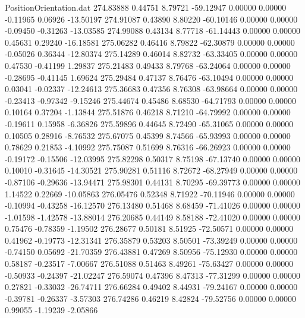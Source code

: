 \begin{filecontents}{PositionOrientation.dat}
 274.83888    0.44751    8.79721   -59.12947    0.00000    0.00000   -0.11965    0.06926  -13.50197
 274.91087    0.43890    8.80220   -60.10146    0.00000    0.00000   -0.09450   -0.31263  -13.03585
 274.99088    0.43134    8.77718   -61.14443    0.00000    0.00000    0.45631    0.29240  -16.18581
 275.06282    0.46416    8.79822   -62.30879    0.00000    0.00000   -0.05026    0.36344  -12.80374
 275.14289    0.46014    8.82732   -63.33405    0.00000    0.00000    0.47530   -0.41199    1.29837
 275.21483    0.49433    8.79768   -63.24064    0.00000    0.00000   -0.28695   -0.41145    1.69624
 275.29484    0.47137    8.76476   -63.10494    0.00000    0.00000    0.03041   -0.02337  -12.24613
 275.36683    0.47356    8.76308   -63.98664    0.00000    0.00000   -0.23413   -0.97342   -9.15246
 275.44674    0.45486    8.68530   -64.71793    0.00000    0.00000    0.10164    0.37204   -1.13844
 275.51876    0.46218    8.71210   -64.79992    0.00000    0.00000   -0.19611    0.15958   -6.36826
 275.59896    0.44645    8.72490   -65.31065    0.00000    0.00000    0.10505    0.28916   -8.76532
 275.67075    0.45399    8.74566   -65.93993    0.00000    0.00000    0.78629    0.21853   -4.10992
 275.75087    0.51699    8.76316   -66.26923    0.00000    0.00000   -0.19172   -0.15506  -12.03995
 275.82298    0.50317    8.75198   -67.13740    0.00000    0.00000    0.10010   -0.31645  -14.30521
 275.90281    0.51116    8.72672   -68.27949    0.00000    0.00000   -0.87106   -0.29636  -13.94471
 275.98301    0.44131    8.70295   -69.39773    0.00000    0.00000    1.14522    0.22669  -10.05863
 276.05476    0.52348    8.71922   -70.11946    0.00000    0.00000   -0.10994   -0.43258  -16.12570
 276.13480    0.51468    8.68459   -71.41026    0.00000    0.00000   -1.01598   -1.42578  -13.88014
 276.20685    0.44149    8.58188   -72.41020    0.00000    0.00000    0.75476   -0.78359   -1.19502
 276.28677    0.50181    8.51925   -72.50571    0.00000    0.00000    0.41962   -0.19773  -12.31341
 276.35879    0.53203    8.50501   -73.39249    0.00000    0.00000   -0.74150    0.05692  -21.70359
 276.43881    0.47269    8.50956   -75.12930    0.00000    0.00000    0.58187   -0.23517   -7.00667
 276.51088    0.51463    8.49261   -75.63427    0.00000    0.00000   -0.50933   -0.24397  -21.02247
 276.59074    0.47396    8.47313   -77.31299    0.00000    0.00000    0.27821   -0.33032  -26.74711
 276.66284    0.49402    8.44931   -79.24167    0.00000    0.00000   -0.39781   -0.26337   -3.57303
 276.74286    0.46219    8.42824   -79.52756    0.00000    0.00000    0.99055   -1.19239   -2.05866

\end{filecontents}
